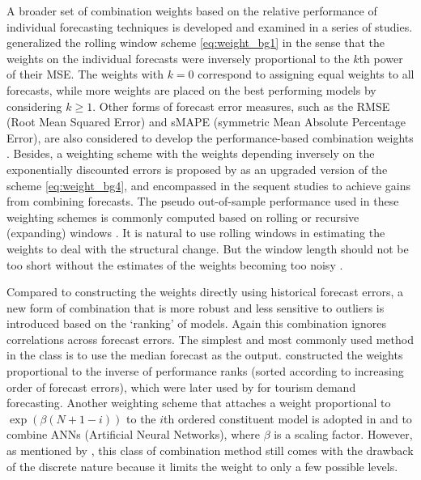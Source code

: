 \documentclass[11pt]{article}
\begin{document}
A broader set of combination weights based on the relative performance of individual forecasting techniques is developed and examined in a series of studies. \cite{Stock1998-np} generalized the rolling window scheme \eqref{eq:weight_bg1} in the sense that the weights on the individual forecasts were inversely proportional to the $k$th power of their MSE. The weights with $k=0$ correspond to assigning equal weights to all forecasts, while more weights are placed on the best performing models by considering $k \geq 1$. Other forms of forecast error measures, such as the RMSE (Root Mean Squared Error) and sMAPE (symmetric Mean Absolute Percentage Error), are also considered to develop the performance-based combination weights \citep[e.g.,][]{Nowotarski2014-ev,Pawlikowski2020-hm}. Besides, a weighting scheme with the weights depending inversely on the exponentially discounted errors is proposed by \cite{Stock2004-rq} as an upgraded version of the scheme \eqref{eq:weight_bg4}, and encompassed in the sequent studies \citep[e.g.,][]{Clark2010-jx,Genre2013-ut} to achieve gains from combining forecasts. The pseudo out-of-sample performance used in these weighting schemes is commonly computed based on rolling or recursive (expanding) windows \citep[e.g.,][]{Stock1998-np,Clark2010-jx,Genre2013-ut}. It is natural to use rolling windows in estimating the weights to deal with the structural change. But the window length should not be too short without the estimates of the weights becoming too noisy \citep{Baumeister2015-ft}.

Compared to constructing the weights directly using historical forecast errors, a new form of combination that is more robust and less sensitive to outliers is introduced based on the `ranking' of models. Again this combination ignores correlations across forecast errors. The simplest and most commonly used method in the class is to use the median forecast as the output. \cite{Aiolfi2006-rh} constructed the weights proportional to the inverse of performance ranks (sorted according to increasing order of forecast errors), which were later used by \cite{Andrawis2011-kb} for tourism demand forecasting. Another weighting scheme that attaches a weight proportional to $\exp (\beta(N+1-i))$ to the $i$th ordered constituent model is adopted in \cite{Yao2008-or} and \cite{Donate2013-lq} to combine ANNs (Artificial Neural Networks), where $\beta$ is a scaling factor. However, as mentioned by \cite{Andrawis2011-kb}, this class of combination method still comes with the drawback of the discrete nature because it limits the weight to only a few possible levels.
\end{document}
